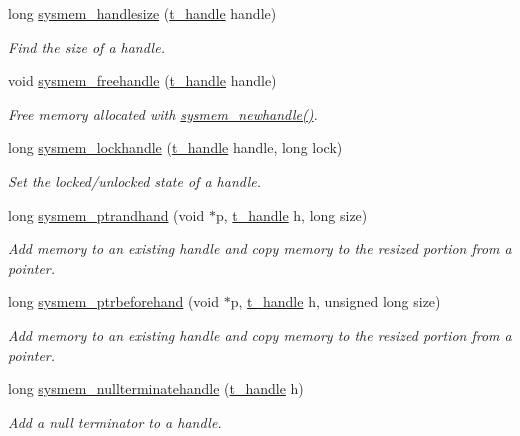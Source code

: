 \begin{DoxyCompactItemize}
long \hyperlink{group__memory_ga84cf5e5a070edef2834faf3b7beed5fe}{sysmem\_\-handlesize} (\hyperlink{group__datatypes_ga0fe64aac41fd3ec071cce295a41d67ad}{t\_\-handle} handle)
\begin{DoxyCompactList}\small\item\em Find the size of a handle. \item\end{DoxyCompactList}\item 
void \hyperlink{group__memory_ga5815994f7d02b77c24f8c684df9acd83}{sysmem\_\-freehandle} (\hyperlink{group__datatypes_ga0fe64aac41fd3ec071cce295a41d67ad}{t\_\-handle} handle)
\begin{DoxyCompactList}\small\item\em Free memory allocated with \hyperlink{group__memory_gacdacfad4785c71dc8c4ce5d4d9714d54}{sysmem\_\-newhandle()}. \item\end{DoxyCompactList}\item 
long \hyperlink{group__memory_ga545ea0e5d3d8f14bda62f8ac6b3e6d71}{sysmem\_\-lockhandle} (\hyperlink{group__datatypes_ga0fe64aac41fd3ec071cce295a41d67ad}{t\_\-handle} handle, long lock)
\begin{DoxyCompactList}\small\item\em Set the locked/unlocked state of a handle. \item\end{DoxyCompactList}\item 
long \hyperlink{group__memory_gab59295d789b6a720b9ab981a39441cbc}{sysmem\_\-ptrandhand} (void $\ast$p, \hyperlink{group__datatypes_ga0fe64aac41fd3ec071cce295a41d67ad}{t\_\-handle} h, long size)
\begin{DoxyCompactList}\small\item\em Add memory to an existing handle and copy memory to the resized portion from a pointer. \item\end{DoxyCompactList}\item 
long \hyperlink{group__memory_ga52dd152965c42f6b1e14cfdf8b102a30}{sysmem\_\-ptrbeforehand} (void $\ast$p, \hyperlink{group__datatypes_ga0fe64aac41fd3ec071cce295a41d67ad}{t\_\-handle} h, unsigned long size)
\begin{DoxyCompactList}\small\item\em Add memory to an existing handle and copy memory to the resized portion from a pointer. \item\end{DoxyCompactList}\item 
long \hyperlink{group__memory_ga2d07c8171a047d92e8bd95f8bb5b2a70}{sysmem\_\-nullterminatehandle} (\hyperlink{group__datatypes_ga0fe64aac41fd3ec071cce295a41d67ad}{t\_\-handle} h)
\begin{DoxyCompactList}\small\item\em Add a null terminator to a handle. \item\end{DoxyCompactList}\end{DoxyCompactItemize}



